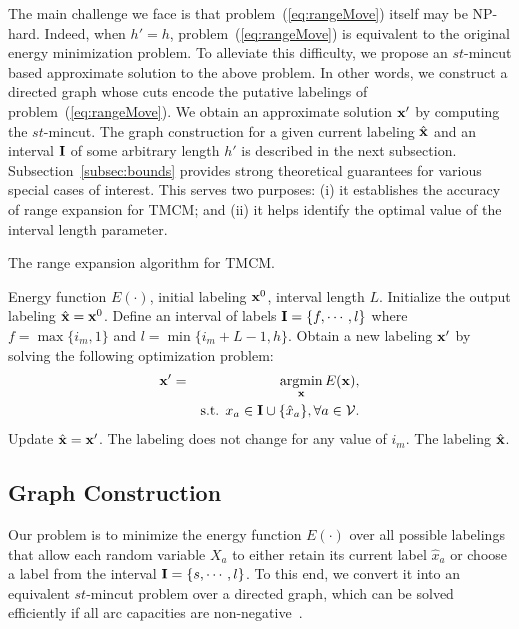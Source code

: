 \documentclass[runningheads]{llncs}
\newcommand{\argmin}{\operatornamewithlimits{argmin}}
\newcommand{\mysubsection}[1]{\vspace{-1mm}\subsection{#1}\vspace{-1mm}}
\begin{document}
The main challenge we face is that problem~(\ref{eq:rangeMove}) itself may be NP-hard. Indeed, when $h'=h$,
problem~(\ref{eq:rangeMove}) is equivalent to the original energy minimization problem. To alleviate this difficulty, we
propose an $st$-{\sc mincut} based approximate solution to the above problem. In other words, we construct a directed graph
whose cuts encode the putative labelings of problem~(\ref{eq:rangeMove}). We obtain an approximate solution ${\bf x}'$ by
computing the $st$-{\sc mincut}. The graph construction for a given current labeling $\hat{\bf x}$ and
an interval ${\bf I}$ of some arbitrary length $h'$ is described in the next subsection. Subsection~\ref{subsec:bounds}
provides strong theoretical guarantees for various special cases of interest. This serves two purposes: (i) it establishes
the accuracy of range expansion for TMCM; and (ii) it helps identify the optimal value of the interval length parameter.
\vspace{-2mm}
\begin{algorithm}
\small
\caption{The range expansion algorithm for TMCM.}
\begin{algorithmic}[1]
\INPUT Energy function $E(\cdot)$, initial labeling ${\bf x}^0$, interval length $L$.
\STATE Initialize the output labeling $\hat{\bf x} = {\bf x}^0$.
\REPEAT
{}
\STATE Define an interval of labels ${\bf I} = \{f,\cdots,l\}$ where $f = \max\{i_m,1\}$ and
$l = \min\{i_m+L-1,h\}$.
\STATE Obtain a new labeling ${\bf x}'$ by solving the following optimization problem:
\begin{eqnarray}
{\bf x}' = && \argmin_{\bf x} E({\bf x}), \nonumber \\
&& \mbox{s.t. } x_a \in {\bf I} \cup \{\hat{x}_a\}, \forall a \in {\cal V}.
\label{eq:rangeMove}
\end{eqnarray}
\STATE Update $\hat{\bf x} = {\bf x}'$.
\ENDIF
\ENDFOR
\UNTIL The labeling does not change for any value of $i_m$.
\OUTPUT The labeling $\hat{\bf x}$.
\end{algorithmic}
\label{algo:rangeExpansion}
\end{algorithm}

\mysubsection{Graph Construction}
\label{subsec:graph}
Our problem is to minimize the energy function $E(\cdot)$ over all possible labelings that allow each random variable $X_a$ to either
retain its current label $\hat{x}_a$ or choose a label from the interval ${\bf I} = \{s,\cdots,l\}$.
To this end, we convert it into an equivalent $st$-{\sc mincut} problem over a directed graph, which can be solved efficiently if all arc capacities are non-negative~\cite{boykovpami04}.
\end{document}
